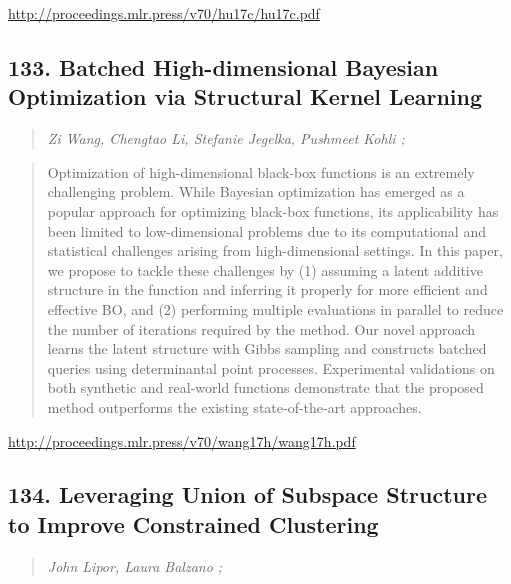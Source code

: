 \documentclass{article}
\begin{document}
\href{http://proceedings.mlr.press/v70/hu17c/hu17c.pdf}{http://proceedings.mlr.press/v70/hu17c/hu17c.pdf}

\subsection{133. Batched High-dimensional Bayesian Optimization via Structural Kernel Learning}

\begin{quote}
\footnotesize{\textit{Zi Wang, Chengtao Li, Stefanie Jegelka, Pushmeet Kohli ;}}

\end{quote}

\begin{quote}
    Optimization of high-dimensional black-box functions is an extremely challenging problem. While Bayesian optimization has emerged as a popular approach for optimizing black-box functions, its applicability has been limited to low-dimensional problems due to its computational and statistical challenges arising from high-dimensional settings. In this paper, we propose to tackle these challenges by (1) assuming a latent additive structure in the function and inferring it properly for more efficient and effective BO, and (2) performing multiple evaluations in parallel to reduce the number of iterations required by the method. Our novel approach learns the latent structure with Gibbs sampling and constructs batched queries using determinantal point processes. Experimental validations on both synthetic and real-world functions demonstrate that the proposed method outperforms the existing state-of-the-art approaches.  
\end{quote}

\href{http://proceedings.mlr.press/v70/wang17h/wang17h.pdf}{http://proceedings.mlr.press/v70/wang17h/wang17h.pdf}

\subsection{134. Leveraging Union of Subspace Structure to Improve Constrained Clustering}

\begin{quote}
\footnotesize{\textit{John Lipor, Laura Balzano ;}}

\end{quote}
\end{document}
